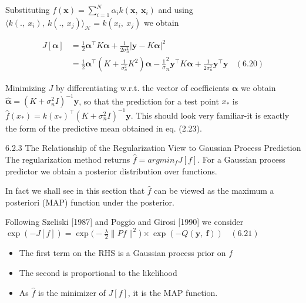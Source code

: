 \documentclass[
  ignorenonframetext,
]{beamer}
\begin{document}
\begin{frame}{}
\protect\hypertarget{section-11}{}
Substituting \(f(\pmb x) =\sum^N_{i=1}\alpha_ik(\pmb x,\ \pmb x_i)\) and
using
\(\langle k(.,\ x_i),\ k(.,\ x_j)\rangle_{\mathcal H}= k(x_i,\ x_j)\) we
obtain

\[
\begin{split}
J[\pmb \alpha ] & = \frac 1 2 \pmb \alpha ^{\top} K \pmb \alpha  + \frac 1 {2\sigma^2_n} |\pmb y − K \pmb \alpha |^2\\
& = \frac 1 2 \pmb \alpha ^{\top} (K + \frac 1 {\sigma^2_n} K^2)\pmb \alpha − \frac 1 \sigma^2_n \pmb y^{\top} K \pmb \alpha  + 
\frac 1 {2\sigma^2_n} \pmb y^{\top} \pmb y \ \ \ \ (6.20)
\end{split}
\]

Minimizing \(J\) by differentiating w.r.t. the vector of coefficients
\(\pmb \alpha\) we obtain
\(\hat {\pmb \alpha} = (K + \sigma_n^2 I)^{−1}\pmb y\), so that the
prediction for a test point \(x_*\) is
\(\hat f(x_*) = k(x_*)^{\top}(K + \sigma_n^2 I)^{−1}\pmb y\). This
should look very familiar-it is exactly the form of the predictive mean
obtained in eq. (2.23).
\end{frame}

\begin{frame}{6.2.3 The Relationship of the Regularization View to
Gaussian Process Prediction}
\protect\hypertarget{the-relationship-of-the-regularization-view-to-gaussian-process-prediction}{}
The regularization method returns \(\hat f = argmin_f J[f]\). For a
Gaussian process predictor we obtain a posterior distribution over
functions.

In fact we shall see in this section that \(\hat f\) can be viewed as
the maximum a posteriori (MAP) function under the posterior.

Following Szeliski {[}1987{]} and Poggio and Girosi {[}1990{]} we
consider
\(\exp (−J[f]) = \exp\bigg( − \frac \lambda 2 \|P f\|^2\bigg) \times \exp (−Q(\pmb y,\ \pmb f)) \ \ \ \ (6.21)\)

\begin{itemize}
\item
  The first term on the RHS is a Gaussian process prior on \(f\)\\
\item
  The second is proportional to the likelihood
\item
  As \(\hat f\) is the minimizer of \(J[f]\), it is the MAP function.
\end{itemize}
\end{frame}
\end{document}
